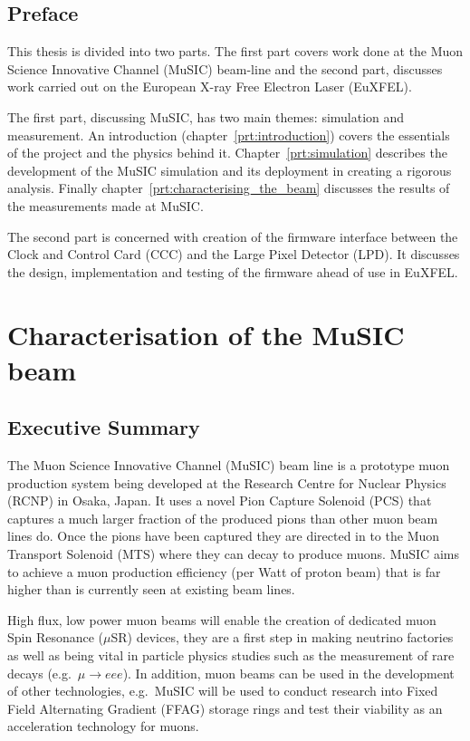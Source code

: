 \chapter*{Preface} %
\label{cha:preface}
This thesis is divided into two parts. The first part covers work done at the Muon Science Innovative Channel (MuSIC) beam-line and the second part, discusses work carried out on the European X-ray Free Electron Laser (EuXFEL).

The first part, discussing MuSIC, has two main themes: simulation and measurement. An introduction (chapter~\ref{prt:introduction}) covers the essentials of the project and the physics behind it. Chapter~\ref{prt:simulation} describes the development of the MuSIC simulation  and its deployment in creating a rigorous analysis. Finally chapter~\ref{prt:characterising_the_beam} discusses the results of the measurements made at MuSIC.

The second part is concerned with creation of the firmware interface between the Clock and Control Card (CCC) and the Large Pixel Detector (LPD). It discusses the design, implementation and testing of the firmware ahead of use in EuXFEL.

\part{Characterisation of the MuSIC beam} %
\label{prt:characterisation_of_the_music_beam}

\chapter{Executive Summary} %
\label{cha:executive_summary}
The Muon Science Innovative Channel (MuSIC) beam line is a prototype muon production system being developed at the Research Centre for Nuclear Physics (RCNP) in Osaka, Japan. It uses a novel Pion Capture Solenoid (PCS) that captures a much larger fraction of the produced pions than other muon beam lines do. Once the pions have been captured they are directed in to the Muon Transport Solenoid (MTS) where they can decay to produce muons. MuSIC aims to achieve a muon production efficiency (per Watt of proton beam) that is far higher than is currently seen at existing beam lines. 

High flux, low power muon beams will enable the creation of dedicated muon Spin Resonance (\(\mu\)SR) devices, they are a first step in making neutrino factories as well as being vital in particle physics studies such as the measurement of rare decays (e.g.\ \(\mu\rightarrow eee\)). In addition, muon beams can be used in the development of other technologies, e.g.\ MuSIC will be used to conduct research into Fixed Field Alternating Gradient (FFAG) storage rings and test their viability as an acceleration technology for muons.

